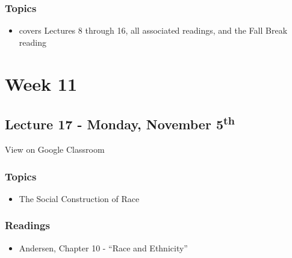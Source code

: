 \documentclass[]{book}
\providecommand{\tightlist}{%
  \setlength{\itemsep}{0pt}\setlength{\parskip}{0pt}}
\theoremstyle{definition}
\theoremstyle{definition}
\theoremstyle{definition}
\theoremstyle{remark}
\begin{document}
\hypertarget{topics-19}{%
\subsubsection*{Topics}\label{topics-19}}

\begin{itemize}
\tightlist
\item
  covers Lectures 8 through 16, all associated readings, and the Fall
  Break reading
\end{itemize}

\hypertarget{week-11}{%
\section*{Week 11}\label{week-11}}

\hypertarget{lecture-17---monday-november-5th}{%
\subsection*{\texorpdfstring{Lecture 17 - Monday, November
5\textsuperscript{th}}{Lecture 17 - Monday, November 5th}}\label{lecture-17---monday-november-5th}}

View on Google Classroom

\hypertarget{topics-20}{%
\subsubsection*{Topics}\label{topics-20}}

\begin{itemize}
\tightlist
\item
  The Social Construction of Race
\end{itemize}

\hypertarget{readings-18}{%
\subsubsection*{Readings}\label{readings-18}}

\begin{itemize}
\tightlist
\item
  Andersen, Chapter 10 - ``Race and Ethnicity''
\end{itemize}
\end{document}
